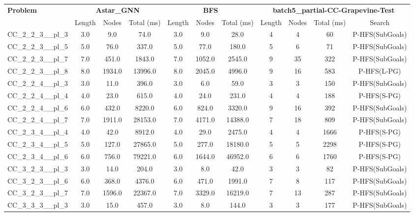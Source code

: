 \begin{table}[!ht]
\centering
\scriptsize
\begin{tabular}{l|ccc|ccc|cccc}
\multirow{2}{*}{\textbf{Problem}} & \multicolumn{3}{c|}{\textbf{Astar\_GNN}} & \multicolumn{3}{c|}{\textbf{BFS}} & \multicolumn{4}{c}{\textbf{batch5\_partial-CC-Grapevine-Test}} \\
\cline{2-11}
& Length & Nodes & Total (ms) & Length & Nodes & Total (ms) & Length & Nodes & Total (ms) & Search \\
\hline
CC\_2\_2\_3\_\_pl\_3 & 3.0 & 9.0 & 74.0 & 3.0 & 9.0 & 28.0 & 4 & 4 & 60 & P-HFS(SubGoals) \\
CC\_2\_2\_3\_\_pl\_5 & 5.0 & 76.0 & 337.0 & 5.0 & 77.0 & 180.0 & 5 & 6 & 71 & P-HFS(SubGoals) \\
CC\_2\_2\_3\_\_pl\_7 & 7.0 & 451.0 & 1843.0 & 7.0 & 1052.0 & 2545.0 & 9 & 35 & 322 & P-HFS(SubGoals) \\
CC\_2\_2\_3\_\_pl\_8 & 8.0 & 1934.0 & 13996.0 & 8.0 & 2045.0 & 4996.0 & 9 & 16 & 583 & P-HFS(L-PG) \\
CC\_2\_2\_4\_\_pl\_3 & 3.0 & 11.0 & 396.0 & 3.0 & 6.0 & 59.0 & 3 & 3 & 150 & P-HFS(SubGoals) \\
CC\_2\_2\_4\_\_pl\_4 & 4.0 & 23.0 & 615.0 & 4.0 & 24.0 & 231.0 & 4 & 4 & 188 & P-HFS(S-PG) \\
CC\_2\_2\_4\_\_pl\_6 & 6.0 & 432.0 & 8220.0 & 6.0 & 824.0 & 3320.0 & 9 & 16 & 392 & P-HFS(SubGoals) \\
CC\_2\_2\_4\_\_pl\_7 & 7.0 & 1911.0 & 28153.0 & 7.0 & 4171.0 & 14388.0 & 7 & 18 & 809 & P-HFS(SubGoals) \\
CC\_2\_3\_4\_\_pl\_4 & 4.0 & 42.0 & 8912.0 & 4.0 & 29.0 & 2475.0 & 4 & 4 & 1666 & P-HFS(S-PG) \\
CC\_2\_3\_4\_\_pl\_5 & 5.0 & 127.0 & 27865.0 & 5.0 & 277.0 & 18180.0 & 5 & 5 & 2298 & P-HFS(S-PG) \\
CC\_2\_3\_4\_\_pl\_6 & 6.0 & 756.0 & 79221.0 & 6.0 & 1644.0 & 46952.0 & 6 & 6 & 1760 & P-HFS(S-PG) \\
CC\_3\_2\_3\_\_pl\_3 & 3.0 & 14.0 & 204.0 & 3.0 & 8.0 & 42.0 & 3 & 3 & 82 & P-HFS(SubGoals) \\
CC\_3\_2\_3\_\_pl\_6 & 6.0 & 368.0 & 4376.0 & 6.0 & 471.0 & 1991.0 & 7 & 8 & 117 & P-HFS(SubGoals) \\
CC\_3\_2\_3\_\_pl\_7 & 7.0 & 1596.0 & 22367.0 & 7.0 & 3329.0 & 16219.0 & 7 & 13 & 287 & P-HFS(SubGoals) \\
CC\_3\_3\_3\_\_pl\_3 & 3.0 & 15.0 & 457.0 & 3.0 & 8.0 & 144.0 & 3 & 3 & 177 & P-HFS(SubGoals) \\

\end{tabular}
\end{table}
